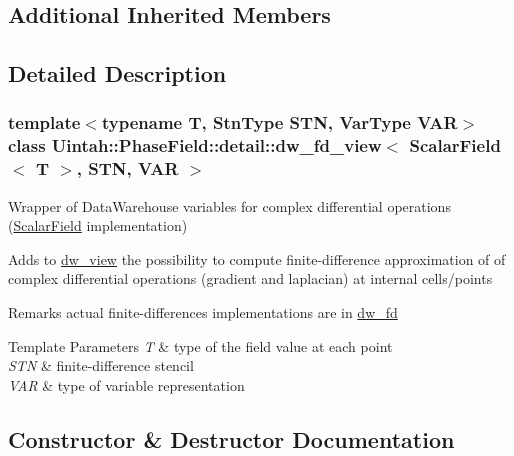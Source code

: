 \subsection*{Additional Inherited Members}


\subsection{Detailed Description}
\subsubsection*{template$<$typename T, Stn\+Type S\+TN, Var\+Type V\+AR$>$\newline
class Uintah\+::\+Phase\+Field\+::detail\+::dw\+\_\+fd\+\_\+view$<$ Scalar\+Field$<$ T $>$, S\+T\+N, V\+A\+R $>$}

Wrapper of Data\+Warehouse variables for complex differential operations (\hyperlink{structUintah_1_1PhaseField_1_1ScalarField}{Scalar\+Field} implementation) 

Adds to \hyperlink{classUintah_1_1PhaseField_1_1detail_1_1dw__view}{dw\+\_\+view} the possibility to compute finite-\/difference approximation of of complex differential operations (gradient and laplacian) at internal cells/points

\begin{DoxyRemark}{Remarks}
actual finite-\/differences implementations are in \hyperlink{classUintah_1_1PhaseField_1_1detail_1_1dw__fd}{dw\+\_\+fd}
\end{DoxyRemark}

\begin{DoxyTemplParams}{Template Parameters}
{\em T} & type of the field value at each point \\
\hline
{\em S\+TN} & finite-\/difference stencil \\
\hline
{\em V\+AR} & type of variable representation \\
\hline
\end{DoxyTemplParams}


\subsection{Constructor \& Destructor Documentation}
\mbox{\label{classUintah_1_1PhaseField_1_1detail_1_1dw__fd__view_3_01ScalarField_3_01T_01_4_00_01STN_00_01VAR_01_4_a1295ecab76eb1e5d9298f6dfb422e50c}} 
